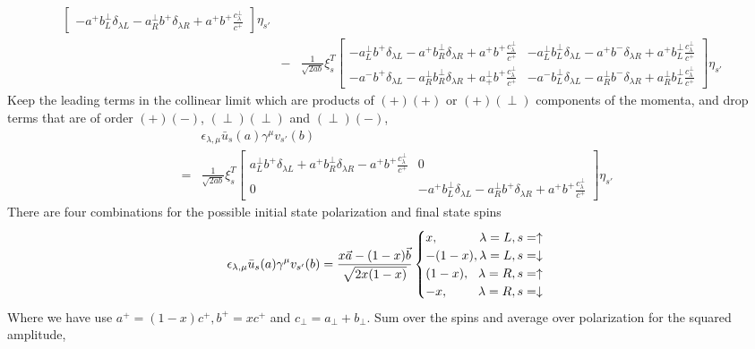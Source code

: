 \begin{eqnarray}
\begin{bmatrix}
-a^+ b^\perp_L \delta_{\lambda L} - a^\perp_R b^+ \delta_{\lambda R} + a^+ b^+\frac{c^\perp_\lambda}{c^+}
\end{bmatrix}
\eta_{s'}\\\nonumber
&-&\frac{1}{\sqrt{2ab}}
\xi_s^T
\begin{bmatrix}
-a^\perp_L b^+ \delta_{\lambda L} - a^+ b^\perp_R \delta_{\lambda R} + a^+ b^+\frac{c^\perp_\lambda}{c^+} &
-a^\perp_L b^\perp_L \delta_{\lambda L} - a^+ b^- \delta_{\lambda R} + a^+ b^\perp_L\frac{c^\perp_\lambda}{c^+}
\\
-a^- b^+ \delta_{\lambda L} - a^\perp_R b^\perp_R \delta_{\lambda R} + a^\perp_+ b^+\frac{c^\perp_\lambda}{c^+} &
-a^- b^\perp_L \delta_{\lambda L} - a^\perp_R b^- \delta_{\lambda R} + a^\perp_R b^\perp_L\frac{c^\perp_\lambda}{c^+}
\end{bmatrix}
\eta_{s'}
\end{eqnarray}
Keep the leading terms in the collinear limit which are products of $(+)(+)$ or $(+)(\perp)$ components of the momenta, and drop terms that are of order $(+)(-)$, $(\perp)(\perp)$ and $(\perp)(-)$,
\begin{eqnarray}
&&\epsilon_{\lambda, \mu} \bar{u}_s(a)\gamma^\mu v_{s'}(b)\\
&=& \frac{1}{\sqrt{2ab}}
\xi_s^T
\begin{bmatrix}
a^\perp_L b^+ \delta_{\lambda L} + a^+ b^\perp_R \delta_{\lambda R} - a^+ b^+\frac{c^\perp_\lambda}{c^+} & 0\\
0 & -a^+ b^\perp_L \delta_{\lambda L} - a^\perp_R b^+ \delta_{\lambda R} + a^+ b^+\frac{c^\perp_\lambda}{c^+}
\end{bmatrix}
\eta_{s'}
\end{eqnarray}
There are four combinations for the possible initial state polarization and final state spins
\begin{eqnarray}
\epsilon_{\lambda, \mu} \bar{u}_s(a)\gamma^\mu v_{s'}(b) = \frac{x\vec{a} - (1-x)\vec{b}}{\sqrt{2x(1-x)}}
\begin{cases}
x, \hfill \lambda=L, s=\uparrow\\
-(1-x), \hfill \lambda=L, s=\downarrow\\
(1-x), \hfill \lambda=R, s=\uparrow\\
-x, \hfill \lambda=R, s=\downarrow\\
\end{cases}
\end{eqnarray}
Where we have use $a^+ = (1-x)c^+, b^+ = xc^+$ and $c_\perp = a_\perp+b_\perp$.
Sum over the spins and average over polarization for the squared amplitude,
